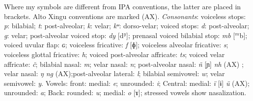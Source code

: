\documentclass[output=paper]{langsci/langscibook}
\begin{document}
Where my symbols are different from IPA conventions, the latter are placed in brackets. Alto Xingu conventions are marked (AX). \emph{Consonants}: voiceless stops: \textit{p}: bilabial; \textit{t}: post-alveolar; \textit{k}: velar; \textit{kʷ}: dorso-velar; voiced stops: \textit{d}: post-alveolar; \textit{g}: velar; post-alveolar voiced stop: \textit{dy} [d$^y$]; prenasal voiced bilabial stop: \textit{mb} [$^m$b]; voiced uvular flap: \textit{ɢ}; voiceless fricative: \textit{f} [ɸ]; voiceless alveolar fricative: \textit{s}; voiceless glottal fricative: \textit{h}; voiced post-alveolar affricate: \textit{ts}; voiced velar affricate: \textit{č}; bilabial nasal: \textit{m}; velar nasal: \textit{n}; post-alveolar nasal: \textit{ñ} [ɲ] \textit{nh} (AX) ; velar nasal: \textit{ŋ} \textit{ng} (AX);post-alveolar lateral: \textit{l}; bilabial semivowel: \textit{w}; velar semivowel: \textit{y}. Vowels: front: medial: \textit{e}; unrounded: \textit{i};  Central: medial: \textit{ï} [ɨ] \textit{ü} (AX); unrounded: \textit{a}; Back: rounded: \textit{u}; medial: \textit{o} [ɤ]; stressed vowels show nasalization.
 
\end{document}
